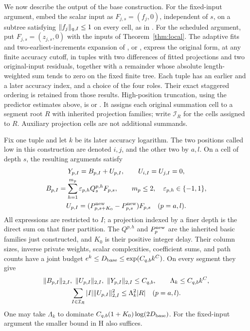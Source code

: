 We now describe the output of the base construction.  For the
fixed-input argument, embed the scalar input as
\(F_{j,s}=(f_j,0)\), independent of \(s\), on a subtree satisfying
\(\lVert f_j\rVert_{q,I}\le1\) on every cell, as in
\cite[Proposition~2.3]{H}.  For the scheduled argument, put
\(F_{j,s}=(z_{j,s},0)\) with the inputs of Theorem~\ref{thm:local}.
The adaptive fits and two-earliest-increments expansion of
\cite[Lemmas~5.4--5.5]{H}, or \cite[Sections~5.1--5.2]{V}, express
the original form, at any finite accuracy cutoff, in tuples with
two differences of fitted projections and two original-input
residuals, together with a remainder whose absolute length-weighted
sum tends to zero on the fixed finite tree.  Each tuple has an
earlier and a later accuracy index, and a choice of the four roles.  Their
exact staggered ordering is retained from those results.
High-position truncation, using the predictor estimates above, is
\cite[Proposition~5.6]{H} or \cite[Sections~5.5--5.6]{V}.  It assigns
each original summation cell to a segment root \(R\) with inherited
projection families; write \(\mathcal I_R\) for the cells assigned
to \(R\).  Auxiliary projection cells are not additional summands.

Fix one tuple and let \(k\) be its later accuracy logarithm.
The two positions called low in this construction are denoted
\(i,j\), and the other two by \(a,l\).  On a cell of depth \(s\),
the resulting arguments satisfy
\begin{equation}
 \begin{gathered}
 Y_{p,I}=B_{p,I}+U_{p,I},\qquad U_{i,I}=U_{j,I}=0,\\
 B_{p,I}=\sum_{h=1}^{m_p}\varepsilon_{p,h}Q^{p,h}_{s}F_{p,s},
 \qquad m_p\le2,\quad \varepsilon_{p,h}\in\{-1,1\},\\
 U_{p,I}=(P^{\rm new}_{p,s+K_0}-P^{\rm new}_{p,s})F_{p,s}
                         \quad(p=a,l).
 \end{gathered}
 \label{eq:analytic-basic-arguments}
\end{equation}
All expressions are restricted to \(I\); a projection indexed by
a finer depth is the direct sum on that finer partition.  The
\(Q^{p,h}\) and \(P^{\rm new}_p\) are the inherited basic families
just constructed, and \(K_0\) is their positive integer delay.
Their column sizes, inverse private weights, scalar complexities,
coefficient sums, and path counts have a joint budget
\(e^k\le D_{\rm base}\le\exp(C_{q,b}k^C)\).
On every segment they give
\begin{equation}
 \begin{gathered}
 \lVert B_{p,I}\rVert_{2,I},\ \lVert U_{p,I}\rVert_{2,I},\
 \lVert Y_{p,I}\rVert_{2,I}\le C_{q,b},\qquad
 \Lambda_k\le C_{q,b}k^C,\\
 \sum_{I\in\mathcal I_R}|I|\lVert U_{p,I}\rVert_{2,I}^2
                  \le\Lambda_k^2|R|\quad(p=a,l).
 \end{gathered}
 \label{eq:analytic-basic-energy}
\end{equation}
One may take \(\Lambda_k\) to dominate
\(C_{q,b}(1+K_0)\log(2D_{\rm base})\).  For the fixed-input
argument the smaller bound in H also suffices.

